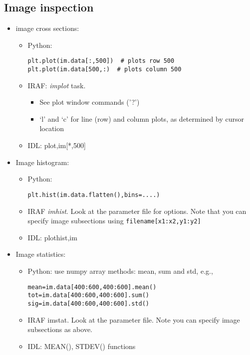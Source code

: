\documentclass{article}
\begin{document}
\subsection*{Image inspection}
\begin{itemize}
\item image cross sections:
    \begin{itemize}
        \item Python:
            \begin{verbatim}
plt.plot(im.data[:,500])  # plots row 500
plt.plot(im.data[500,:)  # plots column 500
            \end{verbatim}
        \item IRAF: \emph{implot} task.
            \begin{itemize}
                \item See plot window commands ('?')
                \item `l' and `c' for line (row) and column plots,
                    as determined by cursor location
            \end{itemize}
        \item IDL: plot,im[*,500]
    \end{itemize}

\item Image histogram:
    \begin{itemize}
        \item Python:
            \begin{verbatim}
plt.hist(im.data.flatten(),bins=....)
            \end{verbatim}
        \item IRAF \emph{imhist}. Look at the parameter file for options.
            Note that you can specify image subsections using
            \texttt{filename[x1:x2,y1:y2]}
        \item IDL: plothist,im
    \end{itemize}

\item Image statistics:
    \begin{itemize}
        \item Python: use numpy array methods: mean, sum and std, e.g.,
            \begin{verbatim}
mean=im.data[400:600,400:600].mean()
tot=im.data[400:600,400:600].sum()
sig=im.data[400:600,400:600].std()
            \end{verbatim}
        \item IRAF imstat. Look at the parameter file. Note you can specify
            image subsections as above.
        \item IDL: MEAN(), STDEV() functions
\end{itemize}


\end{itemize}
\end{document}
